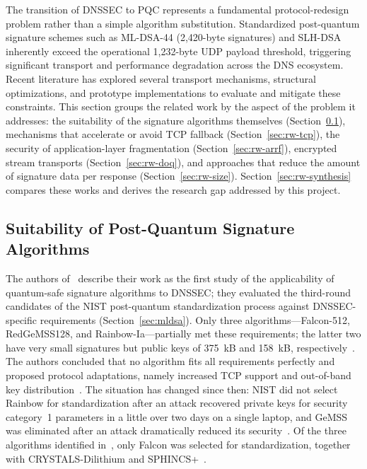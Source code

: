 \documentclass[conference]{IEEEtran}
\begin{document}
The transition of DNSSEC to PQC represents a fundamental protocol-redesign
problem rather than a simple algorithm substitution. Standardized post-quantum
signature schemes such as ML-DSA-44 (2,420-byte signatures) and SLH-DSA
inherently exceed the operational 1,232-byte UDP payload threshold, triggering
significant transport and performance degradation across the DNS ecosystem.
Recent literature has explored several transport mechanisms, structural
optimizations, and prototype implementations to evaluate and mitigate these
constraints. This section groups the related work by the aspect of the problem
it addresses: the suitability of the signature algorithms themselves
(Section~\ref{sec:rw-algorithms}), mechanisms that accelerate or avoid TCP
fallback (Section~\ref{sec:rw-tcp}), the security of application-layer
fragmentation (Section~\ref{sec:rw-arrf}), encrypted stream transports
(Section~\ref{sec:rw-doq}), and approaches that reduce the amount of signature
data per response (Section~\ref{sec:rw-size}).
Section~\ref{sec:rw-synthesis} compares these works and derives the research
gap addressed by this project.

\subsection{Suitability of Post-Quantum Signature Algorithms}
\label{sec:rw-algorithms}

The authors of~\cite{retrofitting} describe their work as the first study of
the applicability of quantum-safe signature algorithms to DNSSEC; they
evaluated the third-round candidates of the NIST post-quantum standardization
process against DNSSEC-specific requirements (Section~\ref{sec:mldsa}). Only
three algorithms---Falcon-512, RedGeMSS128, and Rainbow-Ia---partially met
these requirements; the latter two have very small signatures but public keys
of 375~kB and 158~kB, respectively~\cite{retrofitting}. The authors concluded
that no algorithm fits all requirements perfectly and proposed protocol
adaptations, namely increased TCP support and out-of-band key
distribution~\cite{retrofitting}. The situation has changed since then: NIST
did not select Rainbow for standardization after an attack recovered private
keys for security category~1 parameters in a little over two days on a single
laptop, and GeMSS was eliminated after an attack dramatically reduced its
security~\cite{nistir8413}. Of the three algorithms identified
in~\cite{retrofitting}, only Falcon was selected for standardization, together
with CRYSTALS-Dilithium and SPHINCS+~\cite{nistir8413}.
\end{document}
